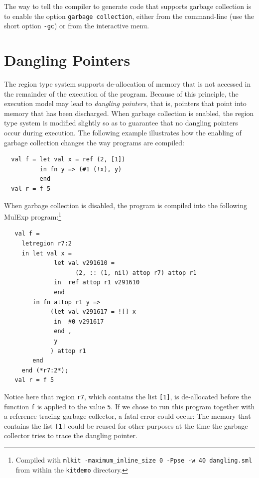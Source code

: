 \documentclass[12pt]{book}
\begin{document}
The way to tell the compiler to generate code that supports garbage
collection is to enable the option {\tt garbage collection}, either
from the command-line (use the short option {\tt -gc}) or from the
interactive menu.

\section{Dangling Pointers}
The region type system supports de-allocation of memory that is not
accessed in the remainder of the execution of the program. Because of
this principle, the execution model may lead to {\em dangling
  pointers}, that is, pointers that point into memory that has been
discharged. When garbage collection is enabled, the region type system
is modified slightly so as to guarantee that no dangling pointers
occur during execution. The following example illustrates how the
enabling of garbage collection changes the way programs are compiled:
\begin{verbatim}
  val f = let val x = ref (2, [1])
          in fn y => (#1 (!x), y)
          end 
  val r = f 5
\end{verbatim}
When garbage collection is disabled, the program is compiled into the
following MulExp program:\footnote{Compiled with {\tt mlkit
    -maximum\_inline\_size 0 -Ppse -w 40 dangling.sml} from within the
  {\tt kitdemo} directory.}
\begin{verbatim}
   val f = 
     letregion r7:2 
     in let val x = 
              let val v291610 = 
                    (2, :: (1, nil) attop r7) attop r1
              in  ref attop r1 v291610
              end 
        in fn attop r1 y => 
             (let val v291617 = ![] x
              in  #0 v291617
              end , 
              y
             ) attop r1
        end  
     end (*r7:2*); 
   val r = f 5
\end{verbatim}
Notice here that region {\tt r7}, which contains the list {\tt [1]},
is de-allocated before the function {\tt f} is applied to the value
{\tt 5}. If we chose to run this program together with a reference
tracing garbage collector, a fatal error could occur: The memory that
contains the list {\tt [1]} could be reused for other purposes at the
time the garbage collector tries to trace the dangling pointer.
\end{document}
